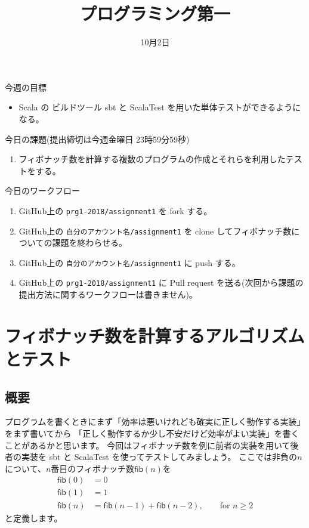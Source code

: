 \documentclass[a4paper,twoside,onecolumn,openany,article]{memoir}
\title{プログラミング第一}
\date{10月2日}
\theoremstyle{plain}
\theoremstyle{remark}
\def\repname{prg1-2018}
\begin{document}
\maketitle


\noindent
今週の目標
\begin{itemize}
\item Scala の ビルドツール sbt と ScalaTest を用いた単体テストができるようになる。
\end{itemize}

\noindent
今日の課題(提出締切は今週金曜日 23時59分59秒)
\begin{enumerate}
\item フィボナッチ数を計算する複数のプログラムの作成とそれらを利用したテストをする。
\end{enumerate}

\noindent
今日のワークフロー
\begin{enumerate}
\item GitHub上の \texttt{\repname/assignment1} を fork する。
\item GitHub上の \verb|自分のアカウント名/assignment1| を clone してフィボナッチ数についての課題を終わらせる。
\item GitHub上の \verb|自分のアカウント名/assignment1| に push する。
\item GitHub上の \texttt{\repname/assignment1} に Pull request を送る(次回から課題の提出方法に関するワークフローは書きません)。
\end{enumerate}

\section{フィボナッチ数を計算するアルゴリズムとテスト}
\subsection{概要}
プログラムを書くときにまず「効率は悪いけれども確実に正しく動作する実装」をまず書いてから
「正しく動作するか少し不安だけど効率がよい実装」を書くことがあるかと思います。
今回はフィボナッチ数を例に前者の実装を用いて後者の実装を sbt と ScalaTest を使ってテストしてみましょう。
ここでは非負の$n$について、$n$番目のフィボナッチ数$\mathsf{fib}(n)$を
\begin{align*}
\mathsf{fib}(0) &= 0\\
\mathsf{fib}(1) &= 1\\
\mathsf{fib}(n) &= \mathsf{fib}(n-1)+\mathsf{fib}(n-2),\qquad\text{for } n\ge 2
\end{align*}
と定義します。
\end{document}
